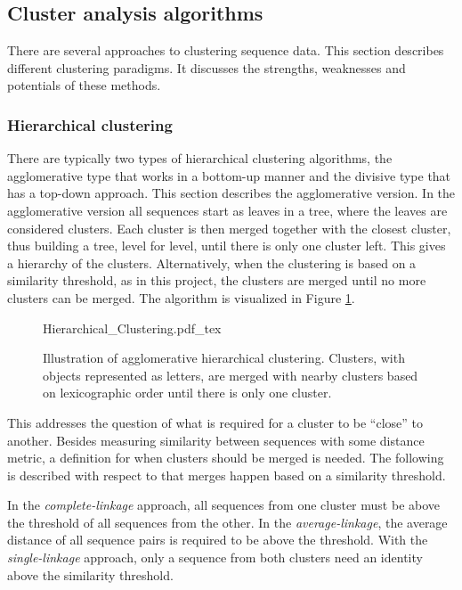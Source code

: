 \subsection{Cluster analysis algorithms}

There are several approaches to clustering sequence data. This section
describes different clustering paradigms. It discusses the strengths,
weaknesses and potentials of these methods.

\subsubsection{Hierarchical clustering}

There are typically two types of hierarchical clustering algorithms, the
agglomerative type that works in a bottom-up manner and the divisive type that
has a top-down approach. This section describes the agglomerative version. In
the agglomerative version all sequences start as leaves in a tree, where the
leaves are considered clusters. Each cluster is then merged together with the
closest cluster, thus building a tree, level for level, until there is only one
cluster left. This gives a hierarchy of the clusters. Alternatively, when the
clustering is based on a similarity threshold, as in this project, the clusters
are merged until no more clusters can be merged. The algorithm is visualized in
Figure \ref{fig:hierarchical_clustering}.

\begin{figure}[h!]
  \centering
  \def\svgwidth{\columnwidth}
  {Hierarchical_Clustering.pdf_tex}
  \caption{Illustration of agglomerative hierarchical clustering. Clusters,
    with objects represented as letters, are merged with nearby clusters based
    on lexicographic order until there is only one cluster.}
  \label{fig:hierarchical_clustering}
\end{figure}

This addresses the question of what is required for a cluster to be ``close''
to another. Besides measuring similarity between sequences with some distance
metric, a definition for when clusters should be merged is needed. The
following is described with respect to that merges happen based on a similarity
threshold.

In the \textit{complete-linkage} approach, all sequences from one cluster must
be above the threshold of all sequences from the other. In the
\textit{average-linkage}, the average distance of all sequence pairs is
required to be above the threshold. With the \textit{single-linkage} approach,
only a sequence from both clusters need an identity above the similarity
threshold.

